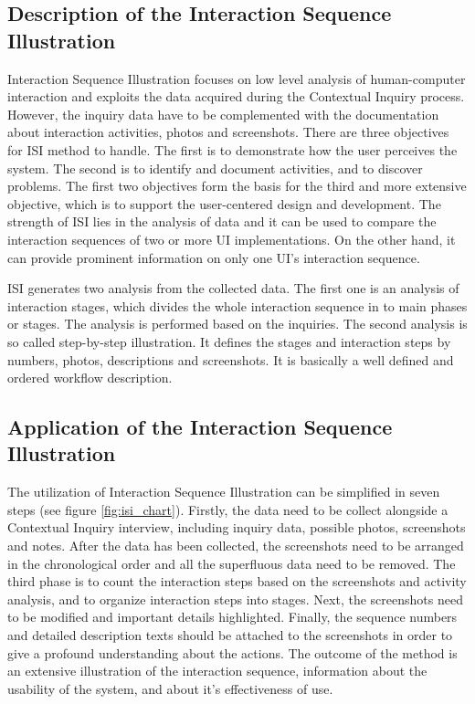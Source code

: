 \documentclass[12pt,a4paper,oneside,pdftex]{report}
\begin{document}
\subsection{Description of the Interaction Sequence Illustration}
Interaction Sequence Illustration focuses on low level analysis of human-computer interaction and exploits the data acquired during the Contextual Inquiry process. However, the inquiry data have to be complemented with the documentation about interaction activities, photos and screenshots. There are three objectives for ISI method to handle. The first is to demonstrate how the user perceives the system. The second is to identify and document activities, and to discover problems. The first two objectives form the basis for the third and more extensive objective, which is to support the user-centered design and development. \citep{RefWorks:17}  The strength of ISI lies in the analysis of data and it can be used to compare the interaction sequences of two or more UI implementations. On the other hand, it can provide prominent information on only one UI's interaction sequence. 

ISI generates two analysis from the collected data. The first one is an analysis of interaction stages, which divides the whole interaction sequence in to main phases or stages. The analysis is performed based on the inquiries. The second analysis is so called step-by-step illustration. It defines the stages and interaction steps by numbers, photos, descriptions and screenshots. \citep{RefWorks:17} It is basically a well defined and ordered workflow description. 

\subsection{Application of the Interaction Sequence Illustration}
The utilization of Interaction Sequence Illustration can be simplified in seven steps (see figure \ref{fig:isi_chart}). Firstly, the data need to be collect alongside a Contextual Inquiry interview, including inquiry data, possible photos, screenshots and notes.
After the data has been collected, the screenshots need to be arranged in the chronological order and all the superfluous data need to be removed. The third phase is to count the interaction steps based on the screenshots and activity analysis, and to organize interaction steps into stages.
Next, the screenshots need to be modified and important details highlighted. Finally, the sequence numbers and  detailed description texts should be attached to the screenshots in order to give a profound understanding about the actions. The outcome of the method is an extensive illustration of the interaction sequence, information about the usability of the system, and about it's effectiveness of use. \citep{RefWorks:17}
	
\end{document}
